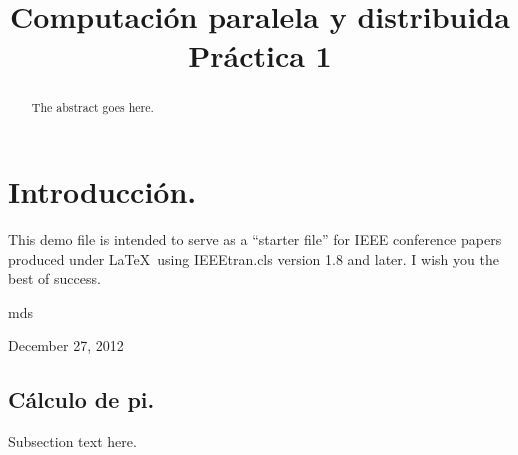 \documentclass{IEEEtran}
\begin{document}
%
\title{Computación paralela y distribuida\\Práctica 1}


\author{
}


\maketitle

\begin{abstract}
The abstract goes here. 
\end{abstract}





%
\IEEEpeerreviewmaketitle



\section{Introducción.}
This demo file is intended to serve as a ``starter file''
for IEEE conference papers produced under \LaTeX\ using
IEEEtran.cls version 1.8 and later.
I wish you the best of success.

\hfill mds
 
\hfill December 27, 2012

\subsection{Cálculo de pi.}
Subsection text here.
\end{document}
